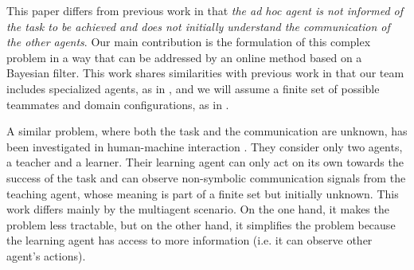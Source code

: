 This paper differs from previous work in that \textit{the ad hoc agent is not informed of the task to be achieved and does not initially understand the communication of the other agents}. Our main contribution is the formulation of this complex problem in a way that can be addressed by an online method based on a Bayesian filter. This work shares similarities with previous work in that our team includes specialized agents, as in \cite{genter2011role}, and we will assume a finite set of possible teammates and domain configurations, as in \cite{genter2011role,barrett2011empirical,barrett2014communicating}.


A similar problem, where both the task and the communication are unknown, has been investigated in human-machine interaction \cite{grizou2013robot,grizou2014interactive}. They consider only two agents, a teacher and a learner. Their learning agent can only act on its own towards the success of the task and can observe non-symbolic communication signals from the teaching agent, whose meaning is part of a finite set but initially unknown. This work differs mainly by the multiagent scenario. On the one hand, it makes the problem less tractable, but on the other hand, it simplifies the problem because the learning agent has access to more information (i.e. it can observe other agent's actions).



